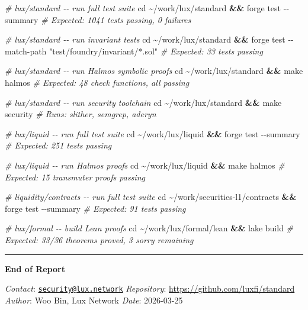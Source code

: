 \documentclass[
]{article}
\newenvironment{Shaded}{}{}
\newcommand{\AttributeTok}[1]{\textcolor[rgb]{0.49,0.56,0.16}{#1}}
\newcommand{\BuiltInTok}[1]{\textcolor[rgb]{0.00,0.50,0.00}{#1}}
\newcommand{\CommentTok}[1]{\textcolor[rgb]{0.38,0.63,0.69}{\textit{#1}}}
\newcommand{\ExtensionTok}[1]{#1}
\newcommand{\FunctionTok}[1]{\textcolor[rgb]{0.02,0.16,0.49}{#1}}
\newcommand{\KeywordTok}[1]{\textcolor[rgb]{0.00,0.44,0.13}{\textbf{#1}}}
\newcommand{\NormalTok}[1]{#1}
\newcommand{\StringTok}[1]{\textcolor[rgb]{0.25,0.44,0.63}{#1}}
\begin{document}
\begin{Shaded}
\begin{Highlighting}[]
\CommentTok{\# lux/standard {-}{-} run full test suite}
\BuiltInTok{cd}\NormalTok{ \textasciitilde{}/work/lux/standard }\KeywordTok{\&\&} \ExtensionTok{forge}\NormalTok{ test }\AttributeTok{{-}{-}summary}
\CommentTok{\# Expected: 1041 tests passing, 0 failures}

\CommentTok{\# lux/standard {-}{-} run invariant tests}
\BuiltInTok{cd}\NormalTok{ \textasciitilde{}/work/lux/standard }\KeywordTok{\&\&} \ExtensionTok{forge}\NormalTok{ test }\AttributeTok{{-}{-}match{-}path} \StringTok{"test/foundry/invariant/*.sol"}
\CommentTok{\# Expected: 33 tests passing}

\CommentTok{\# lux/standard {-}{-} run Halmos symbolic proofs}
\BuiltInTok{cd}\NormalTok{ \textasciitilde{}/work/lux/standard }\KeywordTok{\&\&} \FunctionTok{make}\NormalTok{ halmos}
\CommentTok{\# Expected: 48 check functions, all passing}

\CommentTok{\# lux/standard {-}{-} run security toolchain}
\BuiltInTok{cd}\NormalTok{ \textasciitilde{}/work/lux/standard }\KeywordTok{\&\&} \FunctionTok{make}\NormalTok{ security}
\CommentTok{\# Runs: slither, semgrep, aderyn}

\CommentTok{\# lux/liquid {-}{-} run full test suite}
\BuiltInTok{cd}\NormalTok{ \textasciitilde{}/work/lux/liquid }\KeywordTok{\&\&} \ExtensionTok{forge}\NormalTok{ test }\AttributeTok{{-}{-}summary}
\CommentTok{\# Expected: 251 tests passing}

\CommentTok{\# lux/liquid {-}{-} run Halmos proofs}
\BuiltInTok{cd}\NormalTok{ \textasciitilde{}/work/lux/liquid }\KeywordTok{\&\&} \FunctionTok{make}\NormalTok{ halmos}
\CommentTok{\# Expected: 15 transmuter proofs passing}

\CommentTok{\# liquidity/contracts {-}{-} run full test suite}
\BuiltInTok{cd}\NormalTok{ \textasciitilde{}/work/securities-l1/contracts }\KeywordTok{\&\&} \ExtensionTok{forge}\NormalTok{ test }\AttributeTok{{-}{-}summary}
\CommentTok{\# Expected: 91 tests passing}

\CommentTok{\# lux/formal {-}{-} build Lean proofs}
\BuiltInTok{cd}\NormalTok{ \textasciitilde{}/work/lux/formal/lean }\KeywordTok{\&\&} \ExtensionTok{lake}\NormalTok{ build}
\CommentTok{\# Expected: 33/36 theorems proved, 3 sorry remaining}
\end{Highlighting}
\end{Shaded}

\begin{center}\rule{0.5\linewidth}{0.5pt}\end{center}

\textbf{End of Report}

\emph{Contact}:
\href{mailto:security@lux.network}{\nolinkurl{security@lux.network}}
\emph{Repository}: \url{https://github.com/luxfi/standard}
\emph{Author}: Woo Bin, Lux Network \emph{Date}: 2026-03-25
\end{document}
